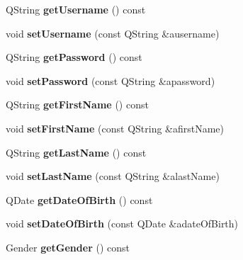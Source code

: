 \begin{DoxyCompactItemize}
\item 
\mbox{\label{classUser_a1c9ee5527f563fb644e0ad6bbab79f41}} 
Q\+String {\bfseries get\+Username} () const
\item 
\mbox{\label{classUser_a198d7bef8341a74dbeb5467291b064ec}} 
void {\bfseries set\+Username} (const Q\+String \&ausername)
\item 
\mbox{\label{classUser_a0479f7f168b8ec592ecc1ea9f95d0868}} 
Q\+String {\bfseries get\+Password} () const
\item 
\mbox{\label{classUser_a51014133b1bddc6fb6f0149bbd3edf43}} 
void {\bfseries set\+Password} (const Q\+String \&apassword)
\item 
\mbox{\label{classUser_a86d1ab75ca7c4ad813ae72b43297fb35}} 
Q\+String {\bfseries get\+First\+Name} () const
\item 
\mbox{\label{classUser_a039cf261172ac2741d4d51306b6e3bb9}} 
void {\bfseries set\+First\+Name} (const Q\+String \&afirst\+Name)
\item 
\mbox{\label{classUser_a9864f7521f7f0bf8132e2464e9df7a02}} 
Q\+String {\bfseries get\+Last\+Name} () const
\item 
\mbox{\label{classUser_a6041d4ae710e6876d3a15accf2a4b08f}} 
void {\bfseries set\+Last\+Name} (const Q\+String \&alast\+Name)
\item 
\mbox{\label{classUser_a8d83a53d7e3487167b98768bd2d09715}} 
Q\+Date {\bfseries get\+Date\+Of\+Birth} () const
\item 
\mbox{\label{classUser_ae8fcd2565331f113e37287789d5f44d2}} 
void {\bfseries set\+Date\+Of\+Birth} (const Q\+Date \&adate\+Of\+Birth)
\item 
\mbox{\label{classUser_a375a79c39b1706939e0449d06b842f1f}} 
Gender {\bfseries get\+Gender} () const
\item 
\mbox{\label{classUser_a89c2e557c37a2c3243d8686f2cc106af}} 

\end{DoxyCompactItemize}
